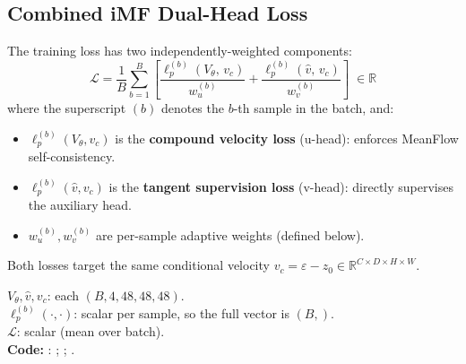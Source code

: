 \subsection{Combined iMF Dual-Head Loss}
\label{sec:dual_loss}

The training loss has two independently-weighted components:
\begin{equation}
  \boxed{
  \mathcal{L}
    = \frac{1}{B}\sum_{b=1}^{B}\!\left[
        \frac{\ell_p^{(b)}(V_\theta,\,v_c)}{w_u^{(b)}}
        + \frac{\ell_p^{(b)}(\hat{v},\,v_c)}{w_v^{(b)}}
      \right]
  }
  \;\in \mathbb{R}
  \label{eq:total_loss}
\end{equation}
where the superscript $(b)$ denotes the $b$-th sample in the batch, and:
\begin{itemize}[nosep]
  \item $\ell_p^{(b)}(V_\theta, v_c)$ is the \textbf{compound velocity loss}
    (u-head): enforces MeanFlow self-consistency.
  \item $\ell_p^{(b)}(\hat{v}, v_c)$ is the \textbf{tangent supervision loss}
    (v-head): directly supervises the auxiliary head.
  \item $w_u^{(b)}, w_v^{(b)}$ are per-sample adaptive weights (defined below).
\end{itemize}
Both losses target the same conditional velocity $v_c = \varepsilon - z_0
\in \mathbb{R}^{C \times D \times H \times W}$.
\begin{shapes}
$V_\theta, \hat{v}, v_c$: each $(B, 4, 48, 48, 48)$.\\
$\ell_p^{(b)}(\cdot, \cdot)$: scalar per sample, so the full vector is $(B,)$.\\
$\mathcal{L}$: scalar (mean over batch).\\
\textbf{Code:} :
;
;
.
\end{shapes}

